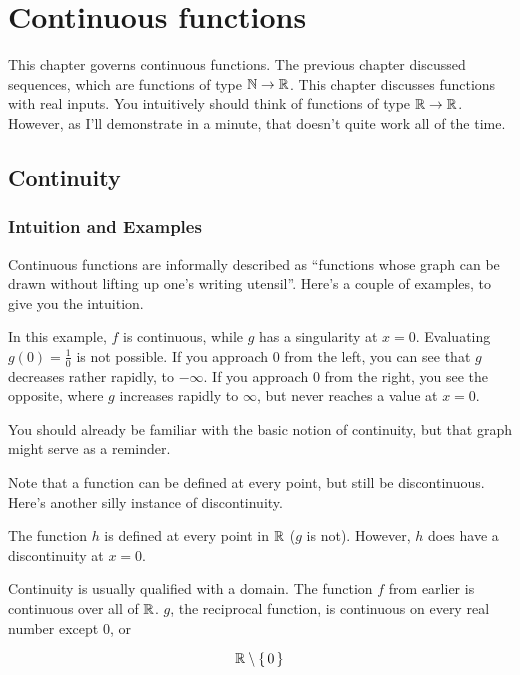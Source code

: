 \chapter{Continuous functions}

This chapter governs continuous functions. The previous chapter discussed
sequences, which are functions of type $\mathbb{N} \to \mathbb{R}$. This chapter discusses
functions with real inputs. You intuitively should think of functions of type
$\mathbb{R} \to \mathbb{R}$. However, as I'll demonstrate in a minute, that doesn't quite work
all of the time.

\section{Continuity}

\subsection{Intuition and Examples}

Continuous functions are informally described as ``functions whose graph can be
drawn without lifting up one's writing utensil''. Here's a couple of examples,
to give you the intuition.


In this example, $f$ is continuous, while $g$ has a singularity at $x = 0$.
Evaluating $g(0) = \frac{1}{0}$ is not possible. If you approach $0$ from the
left, you can see that $g$ decreases rather rapidly, to $-\infty$. If you
approach $0$ from the right, you see the opposite, where $g$ increases rapidly
to $\infty$, but never reaches a value at $x = 0$.

You should already be familiar with the basic notion of continuity, but that
graph might serve as a reminder.

Note that a function can be defined at every point, but still be
discontinuous. Here's another silly instance of discontinuity.


The function $h$ is defined at every point in $\mathbb{R}$ ($g$ is not). However, $h$
does have a discontinuity at $x = 0$.

Continuity is usually qualified with a domain. The function $f$ from earlier is
continuous over all of $\mathbb{R}$. $g$, the reciprocal function, is continuous on
every real number except $0$, or

\begin{equation}
  \label{eq:r-minus-0}
  \mathbb{R} \setminus \left\{\, 0 \,\right\}
\end{equation}


